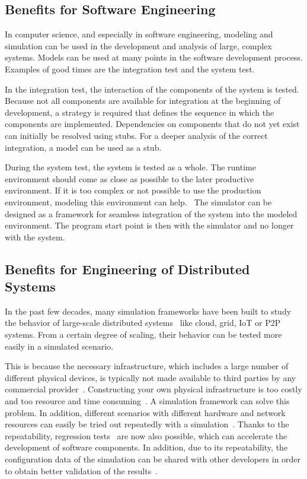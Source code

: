 \documentclass[english,version-2019-11]{uzl-thesis}
\begin{document}
\subsection{Benefits for Software Engineering}
In computer science, and especially in software engineering,
modeling and simulation can be used in the development
and analysis of large, complex systems.
Models can be used at many points in the software development
process. Examples of good times are the integration test and the system test.

In the integration test, the interaction of the components
of the system is tested. Because not all components are available
for integration at the beginning of development, a strategy
is required that defines the sequence in which the 
components are implemented. Dependencies on components
that do not yet exist can initially be resolved
using stubs. For a deeper analysis of the correct
integration, a model can be used as a stub.~\cite{BasisTest}

During the system test, the system is tested as a whole.
The runtime environment should come as close
as possible to the later productive environment.
If it is too complex or not possible to use
the production environment, modeling
this environment can help.~\cite{BasisTest} The simulator can be designed
as a framework for seamless integration of the system
into the modeled environment. The program start point
is then with the simulator and no longer with the system.

\subsection{Benefits for Engineering of Distributed Systems}
In the past few decades, many simulation 
frameworks have been built to study the 
behavior of large-scale distributed systems~\cite{BigDataSim} like
cloud, grid, IoT or P2P systems. From a certain degree
of scaling, their behavior can be tested more easily
in a simulated scenario.

This is because the necessary infrastructure,
which includes a large number of different physical
devices, is typically not made available to third
parties by any commercial provider~\cite{SimOverview}. Constructing
your own physical infrastructure is too costly
and too resource and time consuming~\cite{SimOverview}. A simulation
framework can solve this problem. In addition,
different scenarios with different hardware and
network resources can easily be tried out
repeatedly with a simulation~\cite{BigDataSim}. Thanks to the
repeatability, regression tests~\cite{BasisTest} are now also
possible, which can accelerate the development
of software components. In addition, due to its
repeatability, the configuration data of the
simulation can be shared with other developers in
order to obtain better validation of the results~\cite{BigDataSim}.
\end{document}
